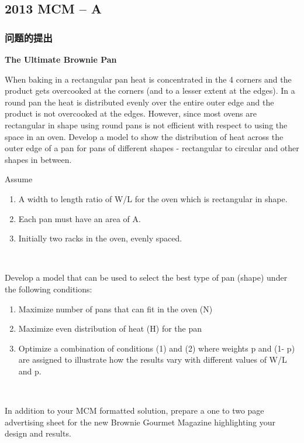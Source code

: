 \documentclass[bwprint]{cumcmthesis}
\begin{document}
\subsection{2013 MCM -- A}

\subsubsection{问题的提出}

\begin{shaded}
\renewcommand{\baselinestretch}{1.0}
\begin{center}
\textbf{The Ultimate Brownie Pan}
\end{center}

\small\noindent
When baking in a rectangular pan heat is concentrated in the 4 corners and the product gets overcooked at the corners (and to a lesser extent at the edges). In a round pan the heat is distributed evenly over the entire outer edge and the product is not overcooked at the edges. However, since most ovens are rectangular in shape using round pans is not efficient with respect to using the space in an oven. Develop a model to show the distribution of heat across the outer edge of a pan for pans of different shapes - rectangular to circular and other shapes in between.\newline

\noindent Assume
\begin{enumerate}
\item A width to length ratio of W/L for the oven which is rectangular in shape.
\item Each pan must have an area of A.
\item Initially two racks in the oven, evenly spaced.
\end{enumerate}\ 

\noindent Develop a model that can be used to select the best type of pan (shape) under the following conditions:
\begin{enumerate}
\item Maximize number of pans that can fit in the oven (N)
\item Maximize even distribution of heat (H) for the pan
\item Optimize a combination of conditions (1) and (2) where weights p and (1- p) are assigned to illustrate how the results vary with different values of W/L and p.
\end{enumerate}\ 

\noindent In addition to your MCM formatted solution, prepare a one to two page advertising sheet for the new Brownie Gourmet Magazine highlighting your design and results.


\end{shaded}
\end{document}
